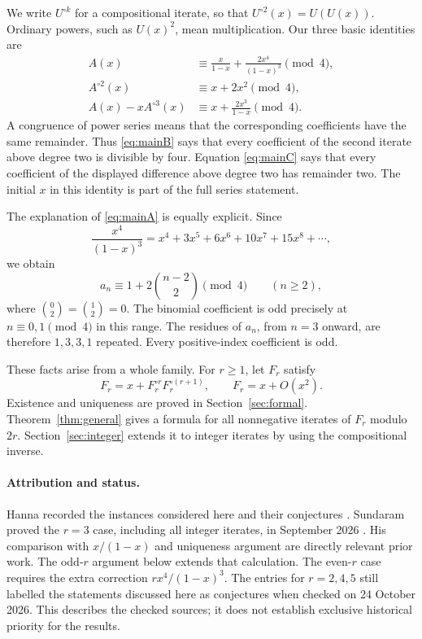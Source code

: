 \documentclass[11pt,a4paper]{article}
\theoremstyle{remark}
\begin{document}
We write $U^{\circ k}$ for a compositional iterate, so that
$U^{\circ2}(x)=U(U(x))$. Ordinary powers, such as $U(x)^2$, mean
multiplication. Our three basic identities are
\begin{align}
A(x)&\equiv\frac{x}{1-x}+\frac{2x^4}{(1-x)^3}\pmod4,
\label{eq:mainA}\\
A^{\circ2}(x)&\equiv x+2x^2\pmod4,
\label{eq:mainB}\\
A(x)-xA^{\circ3}(x)&\equiv x+\frac{2x^3}{1-x}\pmod4.
\label{eq:mainC}
\end{align}
A congruence of power series means that the corresponding coefficients
have the same remainder. Thus \eqref{eq:mainB} says that every
coefficient of the second iterate above degree two is divisible by
four. Equation \eqref{eq:mainC} says that every coefficient of the
displayed difference above degree two has remainder two. The initial
$x$ in this identity is part of the full series statement.

The explanation of \eqref{eq:mainA} is equally explicit. Since
\[
\frac{x^4}{(1-x)^3}
=x^4+3x^5+6x^6+10x^7+15x^8+\cdots,
\]
we obtain
\begin{equation}\label{eq:a-coeff}
a_n\equiv1+2\binom{n-2}{2}\pmod4\qquad(n\ge2),
\end{equation}
where $\binom02=\binom12=0$. The binomial coefficient is odd precisely
at $n\equiv0,1\pmod4$ in this range. The residues of $a_n$, from
$n=3$ onward, are therefore $1,3,3,1$ repeated. Every positive-index
coefficient is odd.

These facts arise from a whole family. For $r\ge1$, let $F_r$ satisfy
\begin{equation}\label{eq:family}
F_r=x+F_r^{\circ r}F_r^{\circ(r+1)},\qquad F_r=x+O(x^2).
\end{equation}
Existence and uniqueness are proved in Section~\ref{sec:formal}.
Theorem~\ref{thm:general} gives a formula for all nonnegative iterates
of $F_r$ modulo $2r$. Section~\ref{sec:integer} extends it to integer
iterates by using the compositional inverse.

\paragraph{Attribution and status.}
Hanna recorded the instances considered here and their conjectures
\cite{oeis099,oeis797,oeis798,oeis807}. Sundaram proved the
$r=3$ case, including all integer iterates, in September 2026
\cite{sundaram}. His comparison with $x/(1-x)$ and uniqueness argument
are directly relevant prior work. The odd-$r$ argument below extends
that calculation. The even-$r$ case requires the extra correction
$rx^4/(1-x)^3$. The entries for $r=2,4,5$ still labelled the statements
discussed here as conjectures when checked on 24 October 2026.
This describes the checked sources; it does not establish exclusive
historical priority for the results.
\end{document}
